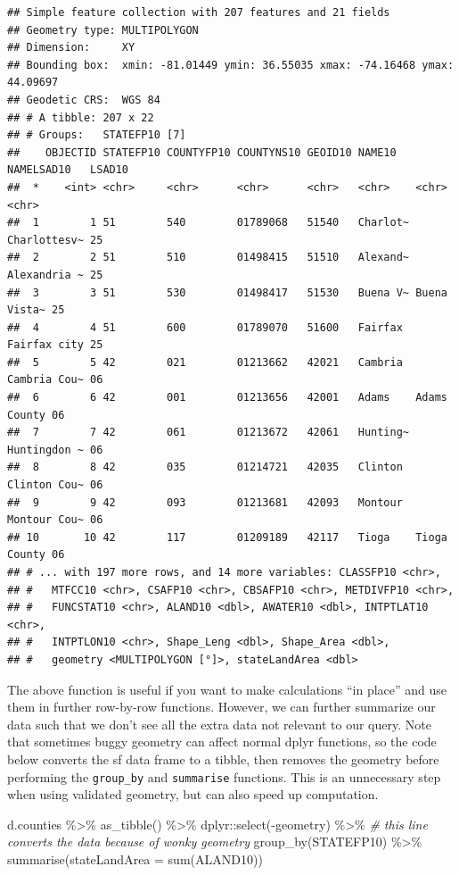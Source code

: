 \documentclass[]{article}
\newenvironment{Shaded}{\begin{snugshade}}{\end{snugshade}}
\newcommand{\AttributeTok}[1]{\textcolor[rgb]{0.77,0.63,0.00}{#1}}
\newcommand{\CommentTok}[1]{\textcolor[rgb]{0.56,0.35,0.01}{\textit{#1}}}
\newcommand{\FunctionTok}[1]{\textcolor[rgb]{0.00,0.00,0.00}{#1}}
\newcommand{\NormalTok}[1]{#1}
\newcommand{\SpecialCharTok}[1]{\textcolor[rgb]{0.00,0.00,0.00}{#1}}
\begin{document}
\begin{verbatim}
## Simple feature collection with 207 features and 21 fields
## Geometry type: MULTIPOLYGON
## Dimension:     XY
## Bounding box:  xmin: -81.01449 ymin: 36.55035 xmax: -74.16468 ymax: 44.09697
## Geodetic CRS:  WGS 84
## # A tibble: 207 x 22
## # Groups:   STATEFP10 [7]
##    OBJECTID STATEFP10 COUNTYFP10 COUNTYNS10 GEOID10 NAME10   NAMELSAD10   LSAD10
##  *    <int> <chr>     <chr>      <chr>      <chr>   <chr>    <chr>        <chr> 
##  1        1 51        540        01789068   51540   Charlot~ Charlottesv~ 25    
##  2        2 51        510        01498415   51510   Alexand~ Alexandria ~ 25    
##  3        3 51        530        01498417   51530   Buena V~ Buena Vista~ 25    
##  4        4 51        600        01789070   51600   Fairfax  Fairfax city 25    
##  5        5 42        021        01213662   42021   Cambria  Cambria Cou~ 06    
##  6        6 42        001        01213656   42001   Adams    Adams County 06    
##  7        7 42        061        01213672   42061   Hunting~ Huntingdon ~ 06    
##  8        8 42        035        01214721   42035   Clinton  Clinton Cou~ 06    
##  9        9 42        093        01213681   42093   Montour  Montour Cou~ 06    
## 10       10 42        117        01209189   42117   Tioga    Tioga County 06    
## # ... with 197 more rows, and 14 more variables: CLASSFP10 <chr>,
## #   MTFCC10 <chr>, CSAFP10 <chr>, CBSAFP10 <chr>, METDIVFP10 <chr>,
## #   FUNCSTAT10 <chr>, ALAND10 <dbl>, AWATER10 <dbl>, INTPTLAT10 <chr>,
## #   INTPTLON10 <chr>, Shape_Leng <dbl>, Shape_Area <dbl>,
## #   geometry <MULTIPOLYGON [°]>, stateLandArea <dbl>
\end{verbatim}

The above function is useful if you want to make calculations ``in
place'' and use them in further row-by-row functions. However, we can
further summarize our data such that we don't see all the extra data not
relevant to our query. Note that sometimes buggy geometry can affect
normal dplyr functions, so the code below converts the sf data frame to
a tibble, then removes the geometry before performing the
\texttt{group\_by} and \texttt{summarise} functions. This is an
unnecessary step when using validated geometry, but can also speed up
computation.

\begin{Shaded}
\begin{Highlighting}[]
\NormalTok{d.counties }\SpecialCharTok{\%\textgreater{}\%} 
  \FunctionTok{as\_tibble}\NormalTok{() }\SpecialCharTok{\%\textgreater{}\%}\NormalTok{ dplyr}\SpecialCharTok{::}\FunctionTok{select}\NormalTok{(}\SpecialCharTok{{-}}\NormalTok{geometry) }\SpecialCharTok{\%\textgreater{}\%} \CommentTok{\# this line converts the data because of wonky geometry}
  \FunctionTok{group\_by}\NormalTok{(STATEFP10) }\SpecialCharTok{\%\textgreater{}\%} 
  \FunctionTok{summarise}\NormalTok{(}\AttributeTok{stateLandArea =} \FunctionTok{sum}\NormalTok{(ALAND10))}
\end{Highlighting}
\end{Shaded}
\end{document}
